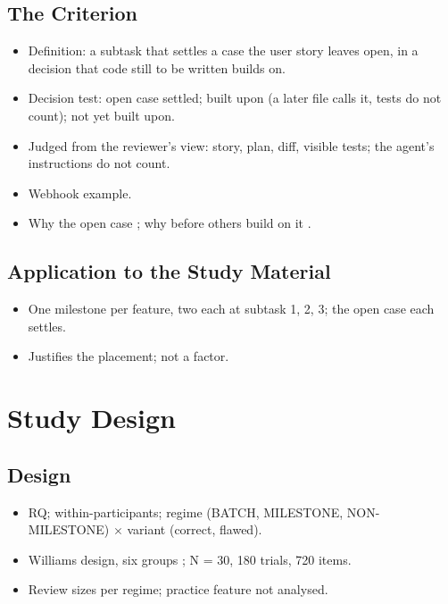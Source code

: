 \section{The Criterion}
\begin{itemize}
  \item Definition: a subtask that settles a case the user story leaves open, in a decision that code still to be written builds on.
  \item Decision test: open case settled; built upon (a later file calls it, tests do not count); not yet built upon.
  \item Judged from the reviewer's view: story, plan, diff, visible tests; the agent's instructions do not count.
  \item Webhook example.
  \item Why the open case \citep{mu_clarifygpt_2024,yang_clarity_2026,dhanorkar_human_2026,zieris_observations_2016}; why before others build on it \citep{kravchuk_modular_2025,zhu_ai_2026,tao_how_2012,iqbal_leveraging_2006}.
\end{itemize}

\section{Application to the Study Material}
\begin{itemize}
  \item One milestone per feature, two each at subtask 1, 2, 3; the open case each settles.
  \item Justifies the placement; not a factor.
\end{itemize}


\chapter{Study Design}
\label{chap:study}

\section{Design}
\begin{itemize}
  \item RQ; within-participants; regime (BATCH, MILESTONE, NON-MILESTONE) \(\times\) variant (correct, flawed).
  \item Williams design, six groups \citep{williams_experimental_1949}; N = 30, 180 trials, 720 items.
  \item Review sizes per regime; practice feature not analysed.
\end{itemize}


